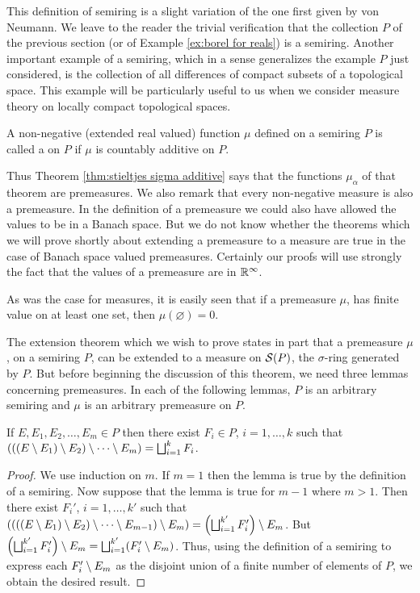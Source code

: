 This definition of semiring is a slight variation of the one first given by von Neumann. We leave to the reader the trivial verification that the collection $P$ of the previous section (or of Example \ref{ex:borel for reals}) is a semiring. Another important example of a semiring, which in a sense generalizes the example $P$ just considered, is the collection of all differences of compact subsets of a topological space. This example will be particularly useful to us when we consider measure theory on locally compact topological spaces.

\begin{definition}
A non-negative (extended real valued) function $\mu$ defined on a semiring $P$ is called a  on $P$ if $\mu$ is countably additive on $P$.
\end{definition}

Thus Theorem \ref{thm:stieltjes sigma additive} says that the functions $\mu_\alpha$ of that theorem are premeasures. We also remark that every non-negative measure is also a premeasure. In the definition of a premeasure we could also have allowed the values to be in a Banach space. But we do not know whether the theorems which we will prove shortly about extending a premeasure to a measure are true in the case of Banach space valued premeasures. Certainly our proofs will use strongly the fact that the values of a premeasure are in $\mathbb{R}^\infty$.

As was the case for measures, it is easily seen that if a premeasure $\mu$, has finite value on at least one set, then $\mu(\varnothing)=0$.

The extension theorem which we wish to prove states in part that a premeasure $\mu$, on a semiring $P$, can be extended to a measure on ${\cal S}(P)$, the $\sigma$-ring generated by $P$. But before beginning the discussion of this theorem, we need three lemmas concerning premeasures. In each of the following lemmas, $P$ is an arbitrary semiring and $\mu$ is an arbitrary premeasure on $P$.

\begin{lemma}\label{lem:repeated set diff}
If $E,E_1,E_2,\dots,E_m\in P$ then there exist $F_i\in P$, $i=1,\dots,k$ such that $(((E\setminus E_1)\setminus E_2)\setminus\cdots\setminus E_m)=\bigsqcup_{i=1}^kF_i$.
\end{lemma}

\begin{proof}
We use induction on $m$. If $m=1$ then the lemma is true by the definition of a semiring. Now suppose that the lemma is true for $m-1$ where $m>1$. Then there exist $F_i'$, $i=1,\dots,k'$ such that $((((E\setminus E_1)\setminus E_2)\setminus\cdots\setminus E_{m-1})\setminus E_m)=\left(\bigsqcup_{i=1}^{k'}F_i'\right)\setminus E_m$. But $\left(\bigsqcup_{i=1}^{k'}F_i'\right)\setminus E_m=\bigsqcup_{i=1}^{k'}(F_i'\setminus E_m)$. Thus, using the definition of a semiring to express each $F_i'\setminus E_m$ as the disjoint union of a finite number of elements of $P$, we obtain the desired result.
\end{proof}


